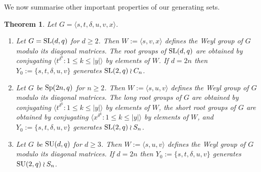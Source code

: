 \documentclass[12pt]{article}
\newtheorem{theorem}[definition]{Theorem}
\def\SL{{\rm SL}}
\def\Sp{{\rm Sp}}
\def\SU{{\rm SU}}
\begin{document}
We now summarise other important properties of our generating sets.  
\begin{theorem}
Let $G = \langle s,t, \delta, u,v, x\rangle$. 
\begin{enumerate}
\item 
Let $G = \SL(d, q)$ for $d \geq 2$. Then $W := \langle s, v, x \rangle$
defines the Weyl group of $G$ modulo its diagonal matrices.
The root groups of $\SL(d, q)$ are obtained by conjugating 
$\langle t^{\delta^k} : 1 \leq k \leq |y| \rangle$ 
by elements of $W$.
If $d = 2n$ then $Y_0:=\{s,t,\delta,u,v\}$
generates $\SL(2,q)\wr C_{n}$.

\item 
Let $G$ be $\Sp(2n, q)$ for $n \geq 2$.
Then $W := \langle s, u, v \rangle$
defines the Weyl group of $G$ modulo its diagonal matrices.
The long root groups of $G$ are obtained
by conjugating $\langle t^{\delta^k} : 1 \leq k \leq |y| \rangle$ 
by elements of $W$, the short root groups of $G$ are obtained
by conjugating $\langle x^{\delta^k} : 1 \leq k \leq |y| \rangle$ by elements of $W$, 
and $Y_0:=\{s,t,\delta,u,v\}$ generates $\SL(2,q)\wr S_n$.

\item 
Let $G$ be $\SU(d, q)$ for $d \geq 3$.
Then $W := \langle s, u, v \rangle$
defines the Weyl group of $G$ modulo its diagonal matrices.
If $d = 2n$ then 
$Y_0:=\{s,t,\delta,u,v\}$ generates $\SU(2, q) \wr S_n$.
\end{enumerate}
\end{theorem}
\end{document}
